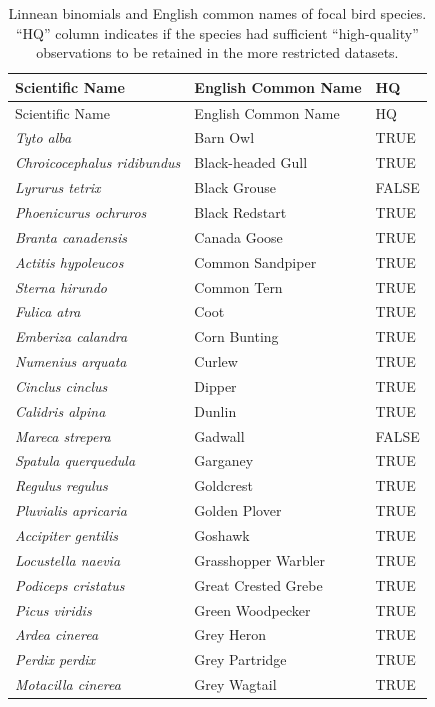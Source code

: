 \documentclass[
]{article}
\begin{document}
\begin{longtable}[]{@{}lll@{}}
\caption{Linnean binomials and English common names of focal bird
species. ``HQ'' column indicates if the species had sufficient
``high-quality'' observations to be retained in the more restricted
datasets.}\tabularnewline
\toprule
Scientific Name & English Common Name & HQ \\
\midrule
\endfirsthead
\toprule
Scientific Name & English Common Name & HQ \\
\midrule
\endhead
\textit{Tyto alba} & Barn Owl & TRUE \\
\textit{Chroicocephalus ridibundus} & Black-headed Gull & TRUE \\
\textit{Lyrurus tetrix} & Black Grouse & FALSE \\
\textit{Phoenicurus ochruros} & Black Redstart & TRUE \\
\textit{Branta canadensis} & Canada Goose & TRUE \\
\textit{Actitis hypoleucos} & Common Sandpiper & TRUE \\
\textit{Sterna hirundo} & Common Tern & TRUE \\
\textit{Fulica atra} & Coot & TRUE \\
\textit{Emberiza calandra} & Corn Bunting & TRUE \\
\textit{Numenius arquata} & Curlew & TRUE \\
\textit{Cinclus cinclus} & Dipper & TRUE \\
\textit{Calidris alpina} & Dunlin & TRUE \\
\textit{Mareca strepera} & Gadwall & FALSE \\
\textit{Spatula querquedula} & Garganey & TRUE \\
\textit{Regulus regulus} & Goldcrest & TRUE \\
\textit{Pluvialis apricaria} & Golden Plover & TRUE \\
\textit{Accipiter gentilis} & Goshawk & TRUE \\
\textit{Locustella naevia} & Grasshopper Warbler & TRUE \\
\textit{Podiceps cristatus} & Great Crested Grebe & TRUE \\
\textit{Picus viridis} & Green Woodpecker & TRUE \\
\textit{Ardea cinerea} & Grey Heron & TRUE \\
\textit{Perdix perdix} & Grey Partridge & TRUE \\
\textit{Motacilla cinerea} & Grey Wagtail & TRUE \\

\end{longtable}
\end{document}
